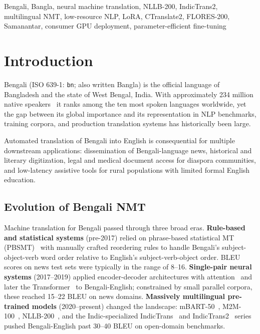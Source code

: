 \documentclass[conference]{IEEEtran}
\begin{document}
\begin{IEEEkeywords}
Bengali, Bangla, neural machine translation, NLLB-200, IndicTrans2,
multilingual NMT, low-resource NLP, LoRA, CTranslate2, FLORES-200,
Samanantar, consumer GPU deployment, parameter-efficient fine-tuning
\end{IEEEkeywords}

\section{Introduction}
\label{sec:intro}

Bengali (ISO 639-1: \texttt{bn}; also written Bangla) is the official
language of Bangladesh and the state of West Bengal, India.
With approximately 234 million native speakers~\cite{ethnologue2023} it
ranks among the ten most spoken languages worldwide, yet the gap between
its global importance and its representation in NLP benchmarks, training
corpora, and production translation systems has historically been large.

Automated translation of Bengali into English is consequential for
multiple downstream applications: dissemination of Bengali-language news,
historical and literary digitization, legal and medical document access
for diaspora communities, and low-latency assistive tools for rural
populations with limited formal English education.

\subsection{Evolution of Bengali NMT}

Machine translation for Bengali passed through three broad eras.
\textbf{Rule-based and statistical systems} (pre-2017) relied on
phrase-based statistical MT (PBSMT)~\cite{koehn2007moses} with manually
crafted reordering rules to handle Bengali's subject-object-verb word
order relative to English's subject-verb-object order.
BLEU scores on news test sets were typically in the range of 8--16.
\textbf{Single-pair neural systems} (2017--2019) applied encoder-decoder
architectures with attention~\cite{bahdanau2015neural} and later the
Transformer~\cite{vaswani2017attention} to Bengali-English; constrained
by small parallel corpora, these reached 15--22 BLEU on news domains.
\textbf{Massively multilingual pre-trained models} (2020--present) changed
the landscape: mBART-50~\cite{liu2020mbart50}, M2M-100~\cite{fan2021m2m100},
NLLB-200~\cite{nllb2022}, and the Indic-specialized
IndicTrans~\cite{ramesh2022samanantar} and
IndicTrans2~\cite{gala2023indictrans2} series pushed Bengali-English past
30--40 BLEU on open-domain benchmarks.
\end{document}
